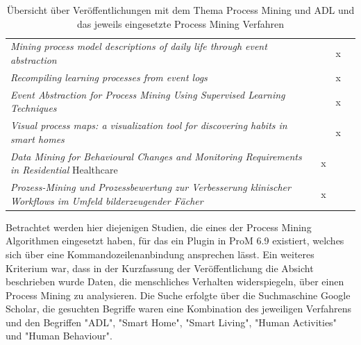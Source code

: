 \begin{table}[!ht]
\begin{tabularx}{\textwidth}{b ccc}
\textit{Mining process model descriptions of daily life through event abstraction} \cite{adl6}                                  &                                        & x                                      &                                         \\
\textit{Recompiling learning processes from event logs} \cite{adl7}                                                             &                                        & x                                      &                                         \\
\textit{Event Abstraction for Process Mining Using Supervised Learning Techniques} \cite{adl8}                                  &                                        & x                                      &                                         \\
\textit{Visual process maps: a visualization tool for discovering habits in smart homes} \cite{adl9}                            &                                        & x                                      &                                         \\
\textit{Data Mining for Behavioural Changes and Monitoring Requirements in Residential} Healthcare \cite{adl10}                  & x                                      &                                        &                                         \\
\textit{Prozess-Mining und Prozessbewertung zur Verbesserung klinischer Workflows im Umfeld bilderzeugender Fächer} \cite{adl11} & x                                      &                                        &                                         \\ \hline

\end{tabularx}

\caption{Übersicht über Veröffentlichungen mit dem Thema Process Mining und ADL und das jeweils eingesetzte Process Mining Verfahren}
 \label{tab:miningPaper}
\end{table}
\normalsize
Betrachtet werden hier diejenigen Studien, die eines der Process Mining Algorithmen eingesetzt haben, für das ein Plugin in ProM 6.9 existiert, welches sich über eine Kommandozeilenanbindung ansprechen lässt. Ein weiteres Kriterium war, dass in der Kurzfassung der Veröffentlichung die Absicht beschrieben wurde Daten, die menschliches Verhalten widerspiegeln, über einen Process Mining zu analysieren. Die Suche erfolgte über die Suchmaschine Google Scholar, die gesuchten Begriffe waren eine Kombination des jeweiligen Verfahrens und den Begriffen "ADL", "Smart Home", "Smart Living", "Human Activities" und "Human Behaviour". 

